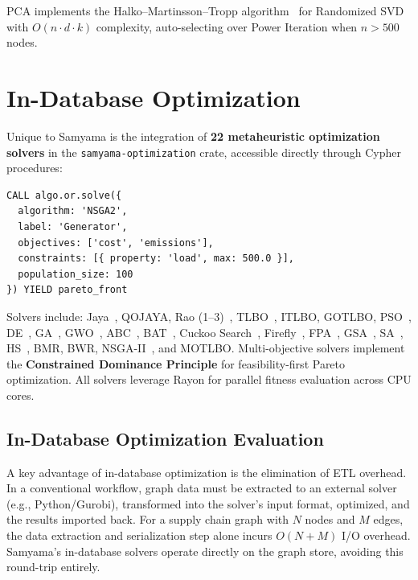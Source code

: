 \documentclass[11pt]{article}
\begin{document}
PCA implements the Halko--Martinsson--Tropp algorithm~\citep{halko2011randomized} for Randomized SVD with $O(n \cdot d \cdot k)$ complexity, auto-selecting over Power Iteration when $n > 500$ nodes.

\section{In-Database Optimization}
\label{sec:optimization}

Unique to Samyama is the integration of \textbf{22 metaheuristic optimization solvers} in the \texttt{samyama-optimization} crate, accessible directly through Cypher procedures:

\begin{minipage}{\linewidth}
\begin{lstlisting}
CALL algo.or.solve({
  algorithm: 'NSGA2',
  label: 'Generator',
  objectives: ['cost', 'emissions'],
  constraints: [{ property: 'load', max: 500.0 }],
  population_size: 100
}) YIELD pareto_front
\end{lstlisting}
\end{minipage}

Solvers include: Jaya~\citep{rao2016jaya}, QOJAYA, Rao (1--3)~\citep{rao2020rao}, TLBO~\citep{rao2011tlbo}, ITLBO, GOTLBO, PSO~\citep{kennedy1995pso}, DE~\citep{storn1997de}, GA~\citep{holland1975ga}, GWO~\citep{mirjalili2014gwo}, ABC~\citep{karaboga2005abc}, BAT~\citep{yang2010bat}, Cuckoo Search~\citep{yang2009cuckoo}, Firefly~\citep{yang2009firefly}, FPA~\citep{yang2012fpa}, GSA~\citep{rashedi2009gsa}, SA~\citep{kirkpatrick1983sa}, HS~\citep{geem2001hs}, BMR, BWR, NSGA-II~\citep{deb2002nsga2}, and MOTLBO. Multi-objective solvers implement the \textbf{Constrained Dominance Principle} for feasibility-first Pareto optimization. All solvers leverage Rayon for parallel fitness evaluation across CPU cores.

\subsection{In-Database Optimization Evaluation}
\label{sec:opt-eval}

A key advantage of in-database optimization is the elimination of ETL overhead. In a conventional workflow, graph data must be extracted to an external solver (e.g., Python/Gurobi), transformed into the solver's input format, optimized, and the results imported back. For a supply chain graph with $N$ nodes and $M$ edges, the data extraction and serialization step alone incurs $O(N + M)$ I/O overhead. Samyama's in-database solvers operate directly on the graph store, avoiding this round-trip entirely.
\end{document}
